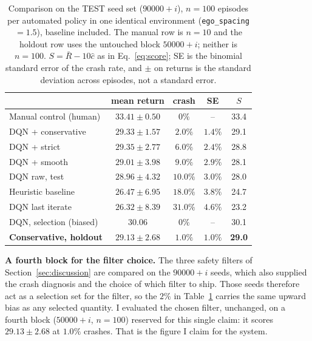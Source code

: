 \documentclass{article}
\newcommand{\agentmean}{28.96}
\newcommand{\agentstd}{4.32}
\newcommand{\agentcrash}{10.0}
\newcommand{\selmean}{30.06}
\newcommand{\selcrash}{0}
\newcommand{\basemean}{26.47}
\newcommand{\basestd}{6.95}
\newcommand{\basecrash}{18.0}
\begin{document}
\begin{table}[t]
\caption{Comparison on the TEST seed set ($90000{+}i$), $n{=}100$ episodes per automated policy in one identical environment (\texttt{ego\_spacing}${=}1.5$), baseline included. The manual row is $n{=}10$ and the holdout row uses the untouched block $50000{+}i$; neither is $n{=}100$. $S=\bar R-10\hat c$ as in Eq.~\ref{eq:score}; SE is the binomial standard error of the crash rate, and $\pm$ on returns is the standard deviation across episodes, not a standard error.}
\label{tab:results}
\vskip 0.15in
\begin{center}
\begin{scriptsize}
\setlength{\tabcolsep}{3.5pt}
\begin{tabular}{lcccc}
\toprule
 & mean return & crash & SE & $S$ \\
\midrule
Manual control (human) & $33.41\pm0.50$ & $0\%$ & -- & 33.4 \\
\midrule
DQN + conservative & $29.33\pm1.57$ & $2.0\%$ & $1.4\%$ & 29.1 \\
DQN + strict & $29.35\pm2.77$ & $6.0\%$ & $2.4\%$ & 28.8 \\
DQN + smooth & $29.01\pm3.98$ & $9.0\%$ & $2.9\%$ & 28.1 \\
DQN raw, test & $\agentmean\pm\agentstd$ & $\agentcrash\%$ & $3.0\%$ & 28.0 \\
Heuristic baseline & $\basemean\pm\basestd$ & $\basecrash\%$ & $3.8\%$ & 24.7 \\
DQN last iterate & $26.32\pm8.39$ & $31.0\%$ & $4.6\%$ & 23.2 \\
\midrule
DQN, selection (biased) & $\selmean$ & $\selcrash\%$ & -- & 30.1 \\
\midrule
\textbf{Conservative, holdout} & $\mathbf{29.13\pm2.68}$ & $\mathbf{1.0\%}$ & $1.0\%$ & \textbf{29.0} \\
\bottomrule
\end{tabular}
\end{scriptsize}
\end{center}
\vskip -0.1in
\end{table}

\textbf{A fourth block for the filter choice.} The three safety filters of Section~\ref{sec:discussion} are compared on the $90000{+}i$ seeds, which also supplied the crash diagnosis and the choice of which filter to ship. Those seeds therefore act as a selection set for the filter, so the $2\%$ in Table~\ref{tab:results} carries the same upward bias as any selected quantity. I evaluated the chosen filter, unchanged, on a fourth block ($50000{+}i$, $n{=}100$) reserved for this single claim: it scores $29.13\pm2.68$ at $1.0\%$ crashes. That is the figure I claim for the system.
\end{document}
